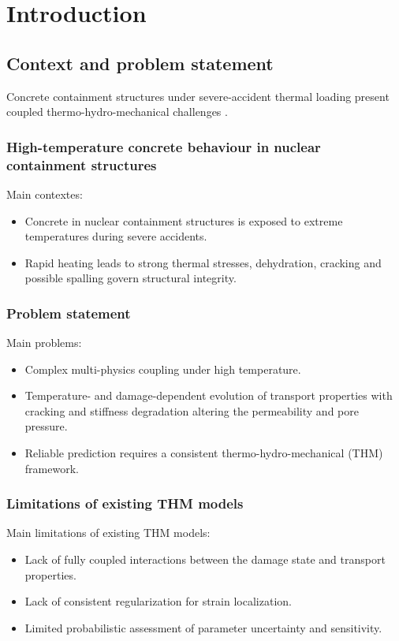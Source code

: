 \documentclass[a4paper,12pt,twoside]{report}     %
\begin{document}

\cleardoublepage
{}
\pagestyle{arabicstyle}

\chapter{Introduction}

\section{Context and problem statement}
Concrete containment structures under severe-accident thermal loading present coupled thermo-hydro-mechanical challenges \cite{dauti_combined_2018}.

\subsection{High-temperature concrete behaviour in nuclear containment structures} 
Main contextes:
\begin{itemize}
    \item Concrete in nuclear containment structures is exposed to extreme temperatures during severe accidents.
    \item Rapid heating leads to strong thermal stresses, dehydration, cracking and possible spalling govern structural integrity.
\end{itemize}

\subsection{Problem statement}
Main problems:
\begin{itemize}
  \item Complex multi-physics coupling under high temperature.
  \item Temperature- and damage-dependent evolution of transport properties with cracking and stiffness degradation altering the permeability and pore pressure.
  \item Reliable prediction requires a consistent thermo-hydro-mechanical (THM) framework.
\end{itemize}


\subsection{Limitations of existing THM models}
Main limitations of existing THM models:
\begin{itemize}
    \item Lack of fully coupled interactions between the damage state and transport properties. 
    \item Lack of consistent regularization for strain localization.
    \item Limited probabilistic assessment of parameter uncertainty and sensitivity.
\end{itemize}
\end{document}

